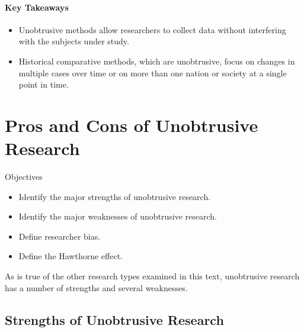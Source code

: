 \paragraph{Key Takeaways}

\begin{itemize}
	\setlength{\itemsep}{0pt}
	\setlength{\parskip}{0pt}
	\setlength{\parsep}{0pt}
	
	\item Unobtrusive methods allow researchers to collect data without interfering with the subjects under study.
	\item Historical comparative methods, which are unobtrusive, focus on changes in multiple cases over time or on more than one nation or society at a single point in time.
	
\end{itemize}

\section{Pros and Cons of Unobtrusive Research}

\begin{center}
	\begin{objbox}{Objectives}
		\begin{itemize}
			\setlength{\itemsep}{0pt}
			\setlength{\parskip}{0pt}
			\setlength{\parsep}{0pt}
			
			\item Identify the major strengths of unobtrusive research.
			\item Identify the major weaknesses of unobtrusive research.
			\item Define researcher bias.
			\item Define the Hawthorne effect.
			
		\end{itemize}
	\end{objbox}
\end{center}

As is true of the other research types examined in this text, unobtrusive research has a number of strengths and several weaknesses.

\subsection{Strengths of Unobtrusive Research}

